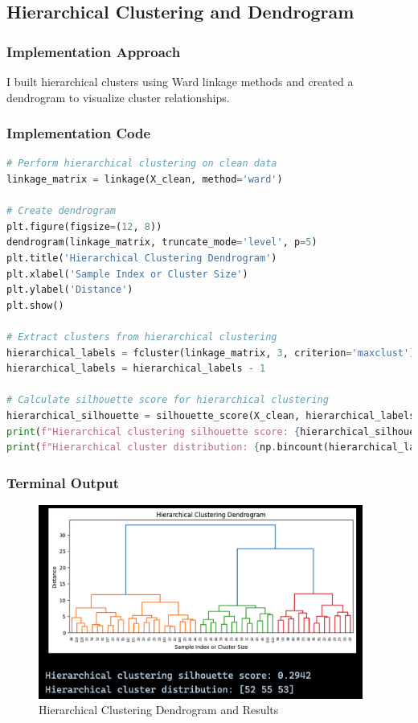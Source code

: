 \documentclass[12pt,a4paper]{article}
\begin{document}
\subsection{Hierarchical Clustering and Dendrogram}

\subsubsection{Implementation Approach}
I built hierarchical clusters using Ward linkage methods and created a dendrogram to visualize cluster relationships.

\subsubsection{Implementation Code}
\begin{lstlisting}[language=Python, caption=Hierarchical Clustering Implementation]
# Perform hierarchical clustering on clean data
linkage_matrix = linkage(X_clean, method='ward')

# Create dendrogram
plt.figure(figsize=(12, 8))
dendrogram(linkage_matrix, truncate_mode='level', p=5)
plt.title('Hierarchical Clustering Dendrogram')
plt.xlabel('Sample Index or Cluster Size')
plt.ylabel('Distance')
plt.show()

# Extract clusters from hierarchical clustering
hierarchical_labels = fcluster(linkage_matrix, 3, criterion='maxclust')
hierarchical_labels = hierarchical_labels - 1

# Calculate silhouette score for hierarchical clustering
hierarchical_silhouette = silhouette_score(X_clean, hierarchical_labels)
print(f"Hierarchical clustering silhouette score: {hierarchical_silhouette:.4f}")
print(f"Hierarchical cluster distribution: {np.bincount(hierarchical_labels)}")
\end{lstlisting}

\subsubsection{Terminal Output}
\begin{figure}[h!]
\centering
    \includegraphics[width=0.95\textwidth]{Figures/dendrogram.png}
    \caption{Hierarchical Clustering Dendrogram and Results}
\end{figure}
\end{document}
